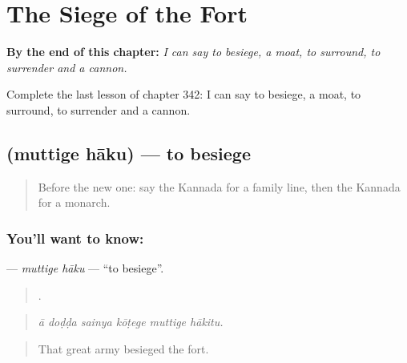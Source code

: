 
\chapter{The Siege of the Fort}
\label{ch:ka-the-siege-of-the-fort}

\begin{chapteropening}
\textbf{By the end of this chapter:} \emph{I can say to besiege, a moat, to surround, to surrender and a cannon.}

Complete the last lesson of chapter 342: I can say to besiege, a moat, to surround, to surrender and a cannon.
\end{chapteropening}

\section[\texorpdfstring{\kn{ಮುತ್ತಿಗೆ} \kn{ಹಾಕು} (muttige hāku)}{ಮುತ್ತಿಗೆ ಹಾಕು (muttige hāku)}]{  (muttige hāku) — to besiege}

\label{lesson:KA-C342-muttige-haku}



\begin{quote}
Before the new one: say the Kannada for a family line, then the Kannada for a monarch.
\end{quote}

\subsection*{You'll want to know:  }
\textbf{ } — \emph{muttige hāku} — \textquotedblleft{}to besiege\textquotedblright{}.

\begin{quote}
     .
\end{quote}

\begin{quote}
\emph{ā doḍḍa sainya kōṭege muttige hākitu.}
\end{quote}

\begin{quote}
That great army besieged the fort.
\end{quote}


